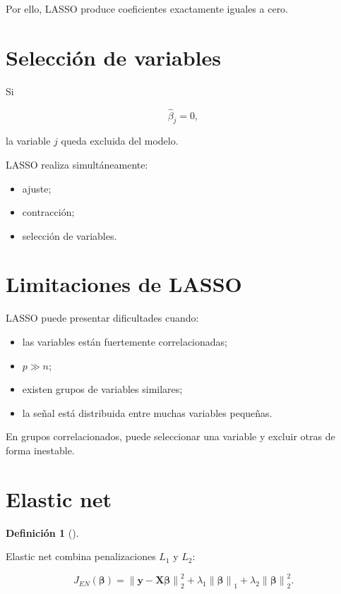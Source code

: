 \documentclass[
  spanish,
  11pt,
  letterpaper,
  DIV=11,
  numbers=noendperiod]{scrreprt}
\providecommand{\tightlist}{%
  \setlength{\itemsep}{0pt}\setlength{\parskip}{0pt}}
\theoremstyle{definition}
\newtheorem{definition}{Definición}[chapter]
\theoremstyle{plain}
\theoremstyle{definition}
\theoremstyle{remark}
\begin{document}
Por ello, LASSO produce coeficientes exactamente iguales a cero.

\section{Selección de variables}\label{selecciuxf3n-de-variables}

Si

\[
\widehat{\beta}_j=0,
\]

la variable \(j\) queda excluida del modelo.

LASSO realiza simultáneamente:

\begin{itemize}
\tightlist
\item
  ajuste;
\item
  contracción;
\item
  selección de variables.
\end{itemize}

\section{Limitaciones de LASSO}\label{limitaciones-de-lasso}

LASSO puede presentar dificultades cuando:

\begin{itemize}
\tightlist
\item
  las variables están fuertemente correlacionadas;
\item
  \(p\gg n\);
\item
  existen grupos de variables similares;
\item
  la señal está distribuida entre muchas variables pequeñas.
\end{itemize}

En grupos correlacionados, puede seleccionar una variable y excluir
otras de forma inestable.

\section{Elastic net}\label{elastic-net}

\begin{definition}[]\protect\hypertarget{def-elastic-net}{}\label{def-elastic-net}

Elastic net combina penalizaciones \(L_1\) y \(L_2\):

\[
J_{EN}(\boldsymbol{\beta})
=
\left\|
\mathbf{y}
-
\mathbf{X}\boldsymbol{\beta}
\right\|_2^2
+
\lambda_1
\left\|
\boldsymbol{\beta}
\right\|_1
+
\lambda_2
\left\|
\boldsymbol{\beta}
\right\|_2^2.
\]

\end{definition}
\end{document}
